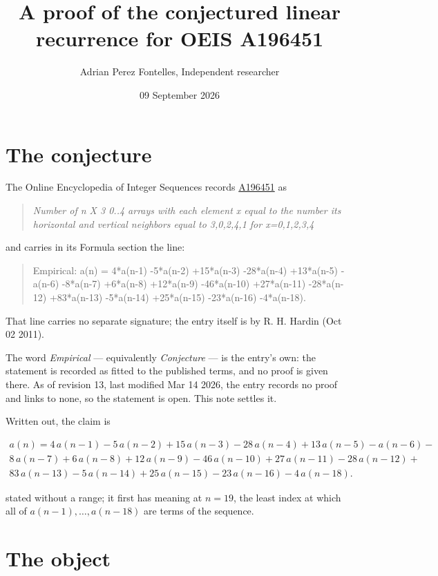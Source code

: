 \documentclass[11pt]{article}
\title{A proof of the conjectured linear recurrence for OEIS A196451}
\author{Adrian Perez Fontelles, Independent researcher}
\date{09 September 2026}
\theoremstyle{definition}
\begin{document}
\maketitle
\section{The conjecture}

The Online Encyclopedia of Integer Sequences records \href{https://oeis.org/A196451}{A196451} as

\begin{quote}\itshape Number of n X 3 0..4 arrays with each element x equal to the number its horizontal and vertical neighbors equal to 3,0,2,4,1 for x=0,1,2,3,4\end{quote}

and carries in its Formula section the line:

\begin{quote}\ttfamily Empirical: a(n) = 4*a(n-1) -5*a(n-2) +15*a(n-3) -28*a(n-4) +13*a(n-5) -a(n-6) -8*a(n-7) +6*a(n-8) +12*a(n-9) -46*a(n-10) +27*a(n-11) -28*a(n-12) +83*a(n-13) -5*a(n-14) +25*a(n-15) -23*a(n-16) -4*a(n-18).\end{quote}

That line carries no separate signature; the entry itself is by R. H. Hardin (Oct 02 2011).

The word {\itshape Empirical} --- equivalently {\itshape Conjecture} --- is the entry's own: the statement is recorded as fitted to the published terms, and no proof is given there. As of revision 13, last modified Mar 14 2026, the entry records no proof and links to none, so the statement is open. This note settles it.

Written out, the claim is

\begin{multline*} a(n) = 4\,a(n-1) - 5\,a(n-2) + 15\,a(n-3) - 28\,a(n-4) + 13\,a(n-5) - a(n-6) - \\ 8\,a(n-7) + 6\,a(n-8) + 12\,a(n-9) - 46\,a(n-10) + 27\,a(n-11) - 28\,a(n-12) + \\ 83\,a(n-13) - 5\,a(n-14) + 25\,a(n-15) - 23\,a(n-16) - 4\,a(n-18). \end{multline*}

stated without a range; it first has meaning at $n = 19$, the least index at which all of $a(n-1),\dots,a(n-18)$ are terms of the sequence.

\section{The object}
\end{document}
